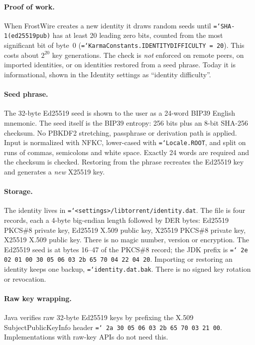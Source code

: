 \documentclass[11pt,a4paper]{article}
\newcommand{\code}[1]{\texttt{\hyphenchar\font=`\-\relax #1}}
\DeclareRobustCommand{\_}{\origunderscore\allowbreak}
\begin{document}
\paragraph{Proof of work.} When FrostWire creates a new identity it draws random seeds until
\code{SHA-1(ed25519\_pub)} has at least 20 leading zero bits, counted from the most
significant bit of byte~0 (\code{KarmaConstants.IDENTITY\_DIFFICULTY = 20}). This costs about
$2^{20}$ key generations. The check is \emph{not} enforced on remote peers, on imported
identities, or on identities restored from a seed phrase. Today it is informational, shown in
the Identity settings as ``identity difficulty''.

\paragraph{Seed phrase.} The 32-byte Ed25519 seed is shown to the user as a 24-word BIP39
English mnemonic. The seed itself is the BIP39 entropy: 256 bits plus an 8-bit SHA-256
checksum. No PBKDF2 stretching, passphrase or derivation path is applied. Input is
normalized with NFKC, lower-cased with \code{Locale.ROOT}, and split on runs of commas,
semicolons and white space. Exactly 24 words are required and the checksum is checked.
Restoring from the phrase recreates the Ed25519 key and generates a \emph{new} X25519 key.

\paragraph{Storage.} The identity lives in \code{<settings>/libtorrent/identity.dat}. The file
is four records, each a 4-byte big-endian length followed by DER bytes: Ed25519 PKCS\#8
private key, Ed25519 X.509 public key, X25519 PKCS\#8 private key, X25519 X.509 public key.
There is no magic number, version or encryption. The Ed25519 seed is at bytes 16--47 of the
PKCS\#8 record; the JDK prefix is \code{30 2e 02 01 00 30 05 06 03 2b 65 70 04 22 04 20}.
Importing or restoring an identity keeps one backup, \code{identity.dat.bak}. There is no
signed key rotation or revocation.

\paragraph{Raw key wrapping.} Java verifies raw 32-byte Ed25519 keys by prefixing the X.509
SubjectPublicKeyInfo header \code{30 2a 30 05 06 03 2b 65 70 03 21 00}. Implementations with
raw-key APIs do not need this.
\end{document}

